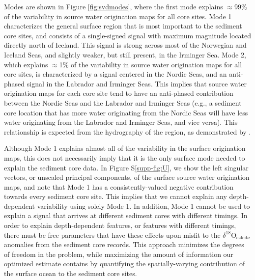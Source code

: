 \documentclass[draft]{agujournal2019}
\begin{document}
Modes are shown in Figure \ref{fig:svdmodes}, where the first mode explains $\approx$99\% of the variability in source water origination maps for all core sites. Mode 1 characterizes the general surface region that is most important to the sediment core sites, and consists of a single-signed signal with maximum magnitude located directly north of Iceland. This signal is strong across most of the Norwegian and Iceland Seas, and slightly weaker, but still present, in the Irminger Sea. Mode 2, which explains $\approx$1\% of the variability in source water origination maps for all core sites, is characterized by a signal centered in the Nordic Seas, and an anti-phased signal in the Labrador and Irminger Seas. This implies that source water origination maps for each core site tend to have an anti-phased contribution between the Nordic Seas and the Labrador and Irminger Seas (e.g., a sediment core location that has more water originating from the Nordic Seas will have less water originating from the Labrador and Irminger Seas, and vice versa). This relationship is expected from the hydrography of the region, as demonstrated by . 

Although Mode 1 explains almost all of the variability in the surface origination maps, this does not necessarily imply that it is the only surface mode needed to explain the sediment core data. In Figure S\ref{supp-fig:U}, we show the left singular vectors, or unscaled principal components, of the surface source water origination maps, and note that Mode 1 has a consistently-valued negative contribution towards every sediment core site. This implies that we cannot explain any depth-dependent variability using solely Mode 1. In addition, Mode 1 cannot be used to explain a signal that arrives at different sediment cores with different timings. %
In order to explain depth-dependent features, or features with different timings, there must be free parameters that have these effects upon misfit to the $\delta^{18}\mathrm{O}_{\mathrm{calcite}}$ anomalies from the sediment core records. %
This approach minimizes the degrees of freedom in the problem, while maximizing the amount of information our optimized estimate contains by quantifying the spatially-varying contribution of the surface ocean to the sediment core sites.
\end{document}
